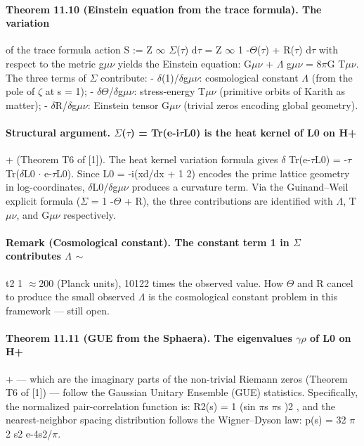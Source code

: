 \documentclass[12pt,a4paper]{article}
\begin{document}
\paragraph*{Theorem 11.10 (Einstein equation from the trace formula). The variation}
of the trace formula action S := Z $\infty$ $\Sigma$($\tau$) d$\tau$ = Z $\infty$ 1 -$\Theta$($\tau$) + R($\tau$)
d$\tau$
with respect to the metric g$\mu$$\nu$ yields the Einstein equation: G$\mu$$\nu$ + $\Lambda$ g$\mu$$\nu$ = 8$\pi$G T$\mu$$\nu$. The three terms of $\Sigma$ contribute:
- $\delta$(1)/$\delta$g$\mu$$\nu$: cosmological constant $\Lambda$ (from the pole of $\zeta$ at s = 1);
- $\delta$$\Theta$/$\delta$g$\mu$$\nu$: stress-energy T$\mu$$\nu$ (primitive orbits of Karith as matter);
- $\delta$R/$\delta$g$\mu$$\nu$: Einstein tensor G$\mu$$\nu$ (trivial zeros encoding global geometry).
\paragraph*{Structural argument. $\Sigma$($\tau$) = Tr(e-i$\tau$L0) is the heat kernel of L0 on H+}
+ (Theorem T6 of [1]). The heat kernel variation formula gives $\delta$ Tr(e-$\tau$L0) = -$\tau$ Tr($\delta$L0 $\cdot$ e-$\tau$L0). Since L0 = -i(xd/dx + 1 2) encodes the prime lattice geometry in log-coordinates, $\delta$L0/$\delta$g$\mu$$\nu$ produces a curvature term. Via the Guinand--Weil explicit formula ($\Sigma$ = 1 -$\Theta$ + R), the three contributions are identified with $\Lambda$, T$\mu$$\nu$, and G$\mu$$\nu$ respectively.
\paragraph*{Remark (Cosmological constant). The constant term 1 in $\Sigma$ contributes $\Lambda$ $\sim$}
t2 1 $\approx$200 (Planck units), 10122 times the observed value. How $\Theta$ and R cancel to produce the small observed $\Lambda$ is the cosmological constant problem in this framework --- still open.
\paragraph*{Theorem 11.11 (GUE from the Sphaera). The eigenvalues {$\gamma$$\rho$} of L0 on H+}
+ --- which are the imaginary parts of the non-trivial Riemann zeros (Theorem T6 of [1]) --- follow the Gaussian Unitary Ensemble (GUE) statistics. Specifically, the normalized pair-correlation function is: R2(s) = 1 (sin $\pi$s $\pi$s )2 , and the nearest-neighbor spacing distribution follows the Wigner--Dyson law: p(s) = 32 $\pi$2 s2 e-4s2/$\pi$.
\end{document}

